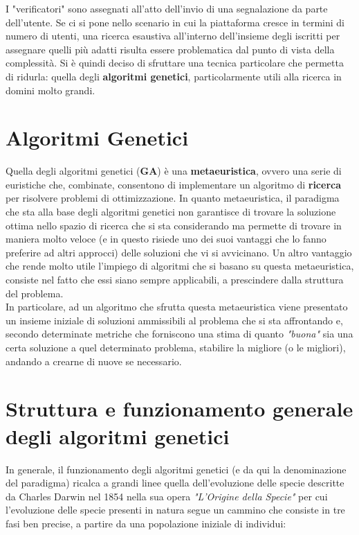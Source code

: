     I "verificatori" sono assegnati all'atto dell'invio di una segnalazione da parte dell'utente. 
    Se ci si pone nello scenario in cui la piattaforma cresce in termini di numero di utenti, una ricerca esaustiva all'interno dell'insieme degli iscritti per assegnare quelli più adatti risulta essere problematica dal punto di vista della complessità. Si è quindi deciso di sfruttare una tecnica particolare che permetta di ridurla: quella degli \textbf{algoritmi genetici}, particolarmente utili alla ricerca in domini molto grandi.

\section{Algoritmi Genetici}
    Quella degli algoritmi genetici (\textbf{GA}) è una \textbf{metaeuristica}, ovvero una serie di euristiche che, combinate, consentono di implementare un algoritmo di \textbf{ricerca} per risolvere problemi di ottimizzazione. In quanto metaeuristica, il paradigma che sta alla base degli algoritmi genetici non garantisce di trovare la soluzione ottima nello spazio di ricerca che si sta considerando ma permette di trovare in maniera molto veloce (e in questo risiede uno dei suoi vantaggi che lo fanno preferire ad altri approcci) delle soluzioni che vi si avvicinano. Un altro vantaggio che rende molto utile l'impiego di algoritmi che si basano su questa metaeuristica, consiste nel fatto che essi siano sempre applicabili, a prescindere dalla struttura del problema. \\
    In particolare, ad un algoritmo che sfrutta questa metaeuristica viene presentato un insieme iniziale di soluzioni ammissibili al problema che si sta affrontando e, secondo determinate metriche che forniscono una stima di quanto \textit{"buona"} sia una certa soluzione a quel determinato problema, stabilire la migliore (o le migliori), andando a crearne di nuove se necessario.

\section{Struttura e funzionamento generale degli algoritmi genetici}
    In generale, il funzionamento degli algoritmi genetici (e da qui la denominazione del paradigma) ricalca a grandi linee quella dell'evoluzione delle specie descritte da Charles Darwin nel 1854 nella sua opera \textit{"L'Origine della Specie"} per cui l'evoluzione delle specie presenti in natura segue un cammino che consiste in tre fasi ben precise, a partire da una popolazione iniziale di individui:

